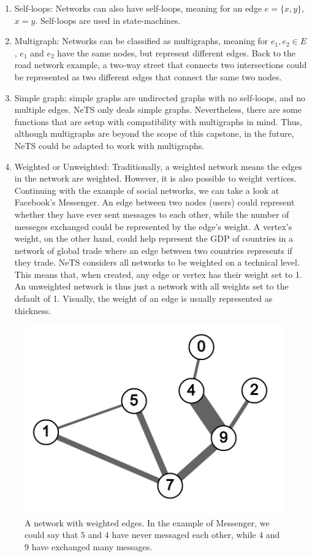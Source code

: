 \begin{enumerate}
  \item Self-loops: Networks can also have self-loops, meaning for an edge $e=\{x,y\}$, $x=y$.
  Self-loops are used in state-machines.
  \item Multigraph: Networks can be classified as multigraphs,
  meaning for $e_1,e_2\in E$, $e_1$ and $e_2$
  have the same nodes, but represent different edges. Back to the road network example, a two-way street that connects two
  intersections could be represented as two different edges that connect the same two nodes.
  \item Simple graph: simple graphs are undirected graphs with no self-loops, and no multiple edges.
  NeTS only deals simple graphs.
  Nevertheless, there are some functions that are setup with compatibility with
  multigraphs in mind. Thus, although multigraphs are beyond the scope of this capstone,
  in the future, NeTS could be adapted to work with multigraphs.
  \item Weighted or Unweighted: Traditionally, a weighted network means the edges in the network are weighted.
  However, it is also possible to weight vertices.
  Continuing with the example of social networks,
  we can take a look at Facebook's Messenger.
  An edge between two nodes (users) could represent
  whether they have ever sent messages to each other,
  while the number of messeges exchanged could
  be represented by the edge's weight.
  A vertex's weight, on the other hand,
  could help represent the GDP of countries in a
  network of global trade where an edge between
  two countries represents if they trade.
  NeTS considers all networks to be weighted on a technical level.
  This means that, when created, any edge or vertex has their weight set to 1.
  An unweighted network is thus just a network with all weights set to the default of 1.
  Visually, the weight of an edge is usually represented as thickness.
\end{enumerate}

\begin{figure}[H]
  \centering
  \includegraphics[scale=.25]{img/weighted_sample.png}
  \caption{A network with weighted edges. In the example of Messenger,
          we could say that $5$ and $4$ have never messaged each other,
          while $4$ and $9$ have exchanged many messages.}
  \label{fig:net_weight}
\end{figure}